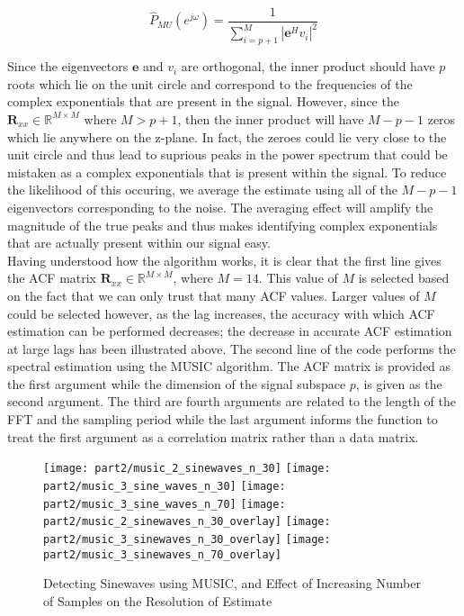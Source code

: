 \begin{equation}
\hat{P}_{MU}(e^{j\omega}) = \frac{1}{\sum_{i=p+1}^M|\textbf{e}^H v_{i}|^2}
\end{equation}

\noindent{}Since the eigenvectors $\textbf{e}$ and $v_{i}$ are orthogonal, the inner product should have $p$ roots which lie on the unit circle and correspond to the frequencies of the complex exponentials that are present in the signal. However, since the $\textbf{R}_{xx} \in \mathbb{R}^{M \times M}$ where $M > p + 1$, then the inner product will have $M-p-1$ zeros which lie anywhere on the z-plane. In fact, the zeroes could lie very close to the unit circle and thus lead to suprious peaks in the power spectrum that could be mistaken as a complex exponentials that is present within the signal. To reduce the likelihood of this occuring, we average the estimate using all of the $M-p-1$ eigenvectors corresponding to the noise. The averaging effect will amplify the magnitude of the true peaks and thus makes identifying complex exponentials that are actually present within our signal easy. \\

\noindent{}Having understood how the algorithm works, it is clear that the first line gives the ACF matrix $\textbf{R}_{xx} \in \mathbb{R}^{M \times M}$, where $M=14$. This value of $M$ is selected based on the fact that we can only trust that many ACF values. Larger values of $M$ could be selected however, as the lag increases, the accuracy with which ACF estimation can be performed decreases; the decrease in accurate ACF estimation at large lags has been illustrated above. The second line of the code performs the spectral estimation using the MUSIC algorithm. The ACF matrix is provided as the first argument while the dimension of the signal subspace $p$, is given as the second argument. The third are fourth arguments are related to the length of the FFT and the sampling period while the last argument informs the function to treat the first argument as a correlation matrix rather than a data matrix. 

\begin{figure}[H]
\centering{}
\texttt{[image: part2/music\_2\_sinewaves\_n\_30]}
\texttt{[image: part2/music\_3\_sine\_waves\_n\_30]}
\texttt{[image: part2/music\_3\_sine\_waves\_n\_70]}
\texttt{[image: part2/music\_2\_sinewaves\_n\_30\_overlay]}
\texttt{[image: part2/music\_3\_sinewaves\_n\_30\_overlay]}
\texttt{[image: part2/music\_3\_sinewaves\_n\_70\_overlay]}
\caption{Detecting Sinewaves using MUSIC, and Effect of Increasing Number of Samples on the Resolution of Estimate}
\label{fig:music}
\end{figure}

